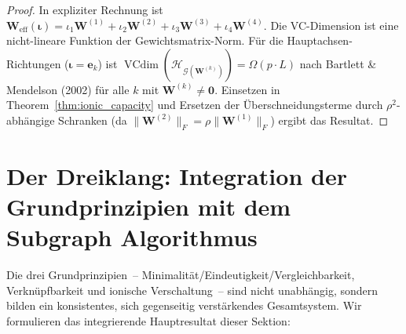 ﻿\documentclass[12pt, a4paper, openany]{report}
\newcommand{\calG}{\mathcal{G}}
\newcommand{\calH}{\mathcal{H}}
\DeclareMathOperator{\VC}{VCdim}
\begin{document}
\begin{proof}
In expliziter Rechnung ist $\bm{W}_{\mathrm{eff}}(\bm{\iota}) = \iota_1
\bm{W}^{(1)} + \iota_2 \bm{W}^{(2)} + \iota_3 \bm{W}^{(3)} + \iota_4 \bm{W}^{(4)}$.
Die VC-Dimension ist eine nicht-lineare Funktion der Gewichtsmatrix-Norm.
Für die Hauptachsen-Richtungen ($\bm{\iota} = \bm{e}_k$) ist
$\VC(\calH_{\calG(\bm{W}^{(k)})}) = \Omega(p \cdot L)$ nach
Bartlett \& Mendelson (2002) für alle $k$ mit $\bm{W}^{(k)} \neq \bm{0}$.
Einsetzen in Theorem~\ref{thm:ionic_capacity} und Ersetzen der
Überschneidungsterme durch $\rho^2$-abhängige Schranken
(da $\|\bm{W}^{(2)}\|_F = \rho \|\bm{W}^{(1)}\|_F$) ergibt das Resultat.
\end{proof}

\section{Der Dreiklang: Integration der Grundprinzipien mit dem Subgraph Algorithmus}
\label{sec:bio_integration}

Die drei Grundprinzipien~-- Minimalität/Eindeutigkeit/Vergleichbarkeit,
Verknüpfbarkeit und ionische Verschaltung~-- sind nicht unabhängig, sondern
bilden ein konsistentes, sich gegenseitig verstärkendes Gesamtsystem.  Wir
formulieren das integrierende Hauptresultat dieser Sektion:
\end{document}
